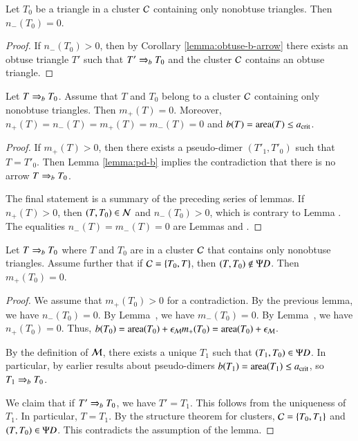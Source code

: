 \begin{lemma} 
  Let $T_0$ be a triangle in a cluster $\mathcal C$ containing only nonobtuse
  triangles.  Then $n_-(T_0)=0$.
\end{lemma}

\begin{proof} 
  If $n_-(T_0)>0$, then by Corollary \ref{lemma:obtuse-b-arrow} there
  exists an obtuse triangle $T'$ such that $T'\Rightarrow_{b} T_0$ and the
  cluster $\mathcal C$ contains an obtuse triangle.
\end{proof}

\begin{lemma} 
  Let $T\Rightarrow_{b} T_0$. Assume that $T$ and $T_0$ belong to a cluster $\mathcal C$
 containing only  nonobtuse triangles.  Then
  $m_+(T)=0$.  Moreover, $n_+(T)=n_-(T)=m_+(T)=m_-(T)=0$ and
  $b(T)={\operatorname{area}}(T)\le a_\text{crit}$.
\end{lemma}

\begin{proof}
  If $m_+(T)>0$, then there exists a pseudo-dimer $(T'_1,T'_0)$ such
  that $T=T'_0$.  Then Lemma \ref{lemma:pd-b} implies the contradiction that
  there is no arrow $T\Rightarrow_{b} T_0$.

  The final statement is a summary of the preceding series of lemmas.
   If $n_+(T)>0$, then $(T,T_0)\in\mathcal N$ and $n_-(T_0)>0$, which is contrary
  to Lemma .    The equalities $n_-(T)=m_-(T)=0$ are
  Lemmas  and .
\end{proof}


\begin{lemma}  
  Let $T\Rightarrow_{b} T_0$ where $T$ and $T_0$ are in a cluster $\mathcal C$ that
  contains only nonobtuse triangles.  Assume further that if
  $\mathcal C=\{T_0,T\}$, then $(T,T_0)\not\in\Psi D$.  Then $m_+(T_0)=0$.
\end{lemma}

\begin{proof}  
  We assume that $m_+(T_0)>0$ for a contradiction.  By the previous
  lemma, we have $n_-(T_0)=0$.  By Lemma~, we have
  $m_-(T_0)=0$.  By Lemma~, we have $n_+(T_0)=0$.
  Thus, $b(T_0) = {\operatorname{area}}(T_0) + \epsilon_{\mathcal M} m_+(T_0) = {\operatorname{area}}(T_0)+\epsilon_{\mathcal M}$.

  By the definition of $\mathcal M$, there exists a unique $T_1$ such that
  $(T_1,T_0)\in \Psi D$.  In particular, by earlier results about
  pseudo-dimers $b(T_1)={\operatorname{area}}(T_1)\le a_\text{crit}$, so $T_1\Rightarrow_{b} T_0$.

  We claim that if $T'\Rightarrow_{b} T_0$, we have $T'=T_1$.  This follows from
  the uniqueness of $T_1$.  In particular, $T=T_1$.  By the structure
  theorem for clusters, $\mathcal C = \{T_0,T_1\}$ and $(T,T_0)\in\Psi D$.  This
  contradicts the assumption of the lemma.
\end{proof}

